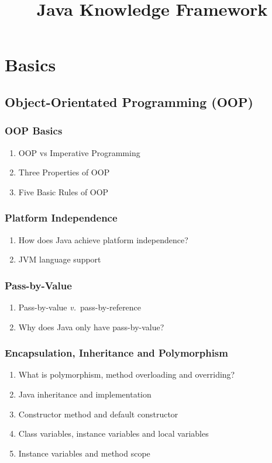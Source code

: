 \documentclass[11pt, twocolumn]{article}
\title{Java Knowledge Framework}
\newcommand{\versus}{\textit{v.}\ }
\begin{document}
\maketitle

\section{Basics}

\subsection{Object-Orientated Programming (OOP)}
\subsubsection{OOP Basics}
\begin{enumerate}
	\item OOP vs Imperative Programming
	\item Three Properties of OOP
	\item Five Basic Rules of OOP
\end{enumerate}

\subsubsection{Platform Independence}
\begin{enumerate}
	\item How does Java achieve platform independence?
	\item JVM language support
\end{enumerate}

\subsubsection{Pass-by-Value}
\begin{enumerate}
	\item Pass-by-value \versus pass-by-reference
	\item Why does Java only have pass-by-value?
\end{enumerate}

\subsubsection{Encapsulation, Inheritance and Polymorphism}
\begin{enumerate}
	\item What is polymorphism, method overloading and overriding?
	\item Java inheritance and implementation
	\item Constructor method and default constructor
	\item Class variables, instance variables and local variables
	\item Instance variables and method scope
\end{enumerate}
\end{document}
